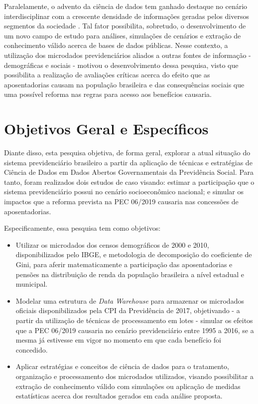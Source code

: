 Paralelamente, o advento da ciência de dados tem ganhado destaque no cenário interdisciplinar com a crescente densidade de informações geradas pelos diversos segmentos da sociedade \cite{cap01_ref5}. Tal fator possibilita, sobretudo, o desenvolvimento de um novo campo de estudo para análises, simulações de cenários e extração de conhecimento válido acerca de bases de dados públicas. Nesse contexto, a utilização dos microdados previdenciários aliados a outras fontes de informação - demográficas e sociais - motivou o desenvolvimento dessa pesquisa, visto que possibilita a realização de avaliações críticas acerca do efeito que as aposentadorias causam na população brasileira e das consequências sociais que uma possível reforma nas regras para acesso aos benefícios causaria.

\section{Objetivos Geral e Específicos}

Diante disso, esta pesquisa objetiva, de forma geral, explorar a atual situação do sistema previdenciário brasileiro a partir da aplicação de técnicas e estratégias de Ciência de Dados em Dados Abertos Governamentais da Previdência Social. Para tanto, foram realizados dois estudos de caso visando: estimar a participação que o sistema previdenciário possui no cenário socioeconômico nacional; e simular os impactos que a reforma prevista na PEC 06/2019 causaria nas concessões de aposentadorias. 

Especificamente, essa pesquisa tem como objetivos:

\begin{itemize}
    \item Utilizar os microdados dos censos demográficos de 2000 e 2010, disponibilizados pelo IBGE, e metodologia de decomposição do coeficiente de Gini, para aferir matematicamente a participação das aposentadorias e pensões na distribuição de renda da população brasileira a nível estadual e municipal.
    
    \item Modelar uma estrutura de \textit{Data Warehouse} para armazenar os microdados oficiais disponibilizados pela CPI da Previdência de 2017, objetivando - a partir da utilização de técnicas de processamento em lotes - simular os efeitos que a PEC 06/2019 causaria no cenário previdenciário entre 1995 a 2016, se a mesma já estivesse em vigor no momento em que cada benefício foi concedido.
    
    \item Aplicar estratégias e conceitos de ciência de dados para o tratamento, organização e processamento dos microdados utilizados, visando possibilitar a extração de conhecimento válido com simulações ou aplicação de medidas estatísticas acerca dos resultados gerados em cada análise proposta.
\end{itemize}

